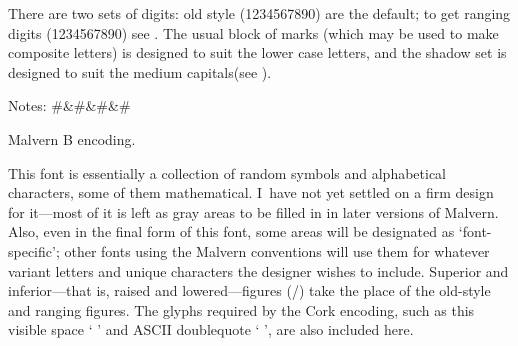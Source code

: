	There are two sets of digits: old style (\lowercase{1234567890})
	are the default; to get ranging digits (\uppercase{1234567890})
	see .  The usual block of marks (which may be
	used to make composite letters) is designed to suit the lower
	case letters, and the shadow set is designed to suit the medium
	capitals\iflong (see )\fi.




\topinsert
	{\rmb \ntable}
\medskip
\noindent
	Notes:
\smallskip
\halign
{#\hfil\quad&\hfil#&\quad\hfil#&\quad#\hfil\cr
}
\caption{Malvern B encoding.}
\endinsert

	This font is essentially a collection of random symbols and
	alphabetical characters, some of them mathematical.  I~have not
	yet settled on a firm design for it---most of it is left as gray
	areas to be filled in in later versions of Malvern.  Also, even
	in the final form of this font, some areas will be designated as
	`font-specific'; other fonts using the Malvern conventions will
	use them for whatever variant letters and unique characters the
	designer wishes to include.
	Superior and inferior---that is, raised and lowered---figures
	(\lowercase{{}}/\uppercase{{}})
	take the place of the old-style and ranging figures.  The glyphs
	required by the Cork encoding, such as this visible space
	`{\rmb{} }' and ASCII doublequote `{\rmb{} }', are
	also included here.


	
